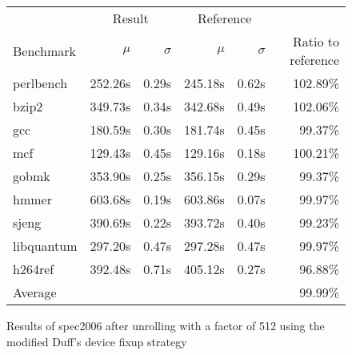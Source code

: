 \begin{figure}[h]
    \begin{center}
        \begin{tabular}{lrrrrr}
            \toprule
            & \multicolumn{2}{c}{Result} & \multicolumn{2}{c}{Reference}\\
            Benchmark & $\mu$ & $\sigma$ & $\mu$ & $\sigma$ & Ratio to reference\\
            \midrule
            perlbench & 252.26s & 0.29s & 245.18s & 0.62s & 102.89\%\\
            bzip2 & 349.73s & 0.34s & 342.68s & 0.49s & 102.06\%\\
            gcc & 180.59s & 0.30s & 181.74s & 0.45s & 99.37\%\\
            mcf & 129.43s & 0.45s & 129.16s & 0.18s & 100.21\%\\
            gobmk & 353.90s & 0.25s & 356.15s & 0.29s & 99.37\%\\
            hmmer & 603.68s & 0.19s & 603.86s & 0.07s & 99.97\%\\
            sjeng & 390.69s & 0.22s & 393.72s & 0.40s & 99.23\%\\
            libquantum & 297.20s & 0.47s & 297.28s & 0.47s & 99.97\%\\
            h264ref & 392.48s & 0.71s & 405.12s & 0.27s & 96.88\%\\
            \midrule
            Average & & & & & 99.99\%\\
            \bottomrule
        \end{tabular}
    \end{center}
    \caption{Results of spec2006 after unrolling with a factor of 512 using the modified Duff's device fixup strategy}
    \label{fig:eval:perf:duff:512}
\end{figure}
